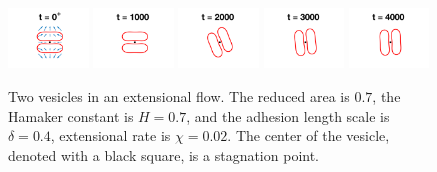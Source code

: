 \documentclass[prf,superscriptaddress,showpacs]{revtex4-1}
\begin{document}
\begin{figure}[htp]
  \includegraphics[width = 0.19\textwidth,trim={5cm 2cm 5cm 1cm},clip]{figs/extensional_adR4em1adS7em1Chi2em2_ra070_image01.png}
  \includegraphics[width = 0.19\textwidth,trim={5cm 2cm 5cm 1cm},clip]{figs/extensional_adR4em1adS7em1Chi2em2_ra070_image02.png}
  \includegraphics[width = 0.19\textwidth,trim={5cm 2cm 5cm 1cm},clip]{figs/extensional_adR4em1adS7em1Chi2em2_ra070_image03.png}
  \includegraphics[width = 0.19\textwidth,trim={5cm 2cm 5cm 1cm},clip]{figs/extensional_adR4em1adS7em1Chi2em2_ra070_image04.png}
  \includegraphics[width = 0.19\textwidth,trim={5cm 2cm 5cm 1cm},clip]{figs/extensional_adR4em1adS7em1Chi2em2_ra070_image05.png}
  \caption{\label{fig:extensional1} Two vesicles in an extensional flow.
  The reduced area is $0.7$, the Hamaker constant is $H = 0.7$, and the
  adhesion length scale is $\delta = 0.4$, extensional rate is $\chi =
  0.02$.  The center of the vesicle, denoted with a black square, is a
  stagnation point.}
\end{figure}
\end{document}
